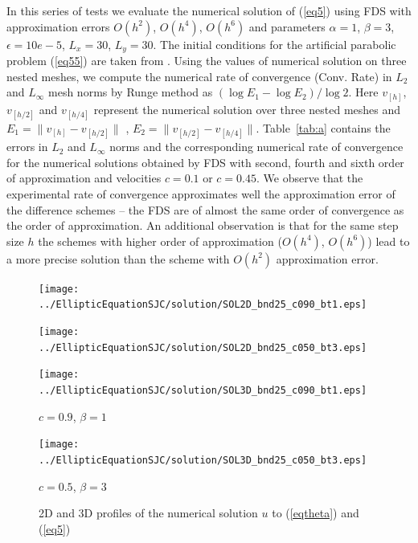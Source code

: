 \documentclass{article}
\newcommand{\rf}[1]{(\ref{#1})}
\begin{document}
 In this series of tests we evaluate the numerical solution of \rf{eq5} using FDS with approximation errors $O(h^2)$, $O(h^4)$, $O(h^6)$ and parameters  
 $\alpha = 1$,   $\beta=3$,  $\epsilon = 10e-5$, 
$L_{x }= 30$, $L_{y} = 30$.
The initial conditions for the artificial parabolic problem \rf{eq55} are taken from  \cite{Ch2011}. 
Using the values of numerical solution on three nested meshes, we compute the numerical rate of convergence (Conv. Rate) in $L_2$ and $L_{\infty}$ mesh norms
by Runge method as $(\log E_1 -\log E_2)/\log 2$.  Here  $v_{[h]}$, $v_{ {[h/2]}  }$ and  $v_{ {[h/4]}  }$ represent the numerical solution over three nested meshes and $E_1=\|v_{[h]}-v_{[h/2]}\|$ , $E_2=\|v_{[h/2]}-v_{[h/4]}\|$.  
Table~\ref{tab:a} contains the errors in $L_2$ and $L_{\infty}$ norms and the corresponding numerical rate of convergence for the numerical solutions obtained by FDS with second, fourth and sixth order of approximation and   velocities  $c=0.1$  or $c=0.45$.
We observe that the experimental rate of convergence approximates well the approximation error of the difference schemes -- the FDS are of  almost the same order of convergence as the order of approximation. An additional observation  is that  for  the same step size $h$ the schemes with higher order of approximation ($O(h^4)$, $O(h^6)$) lead to a more precise solution than the scheme with $O(h^2)$ approximation error. 

\begin{figure}[ht]
	\begin{minipage}[b]{0.5\linewidth}
		\raggedleft
		\texttt{[image: ../EllipticEquationSJC/solution/SOL2D\_bnd25\_c090\_bt1.eps]}
	\end{minipage}
	\begin{minipage}[b]{0.5\linewidth}
		\raggedright
		\texttt{[image: ../EllipticEquationSJC/solution/SOL2D\_bnd25\_c050\_bt3.eps]}
	\end{minipage}
	\begin{minipage}[b]{0.45\linewidth}
		 \raggedleft
		\texttt{[image: ../EllipticEquationSJC/solution/SOL3D\_bnd25\_c090\_bt1.eps]}
		\centerline{$c = 0.9$, $\beta = 1$}
	\end{minipage}
	\begin{minipage}[b]{0.5\linewidth}
		 \raggedright
		\texttt{[image: ../EllipticEquationSJC/solution/SOL3D\_bnd25\_c050\_bt3.eps]}
		\centerline{$c = 0.5$, $\beta = 3$}
	\end{minipage}
	\caption{2D and 3D profiles of the numerical solution $u$ to \rf{eqtheta} and \rf{eq5}}
	\label{fig:solutions}
\end{figure}
\end{document}
